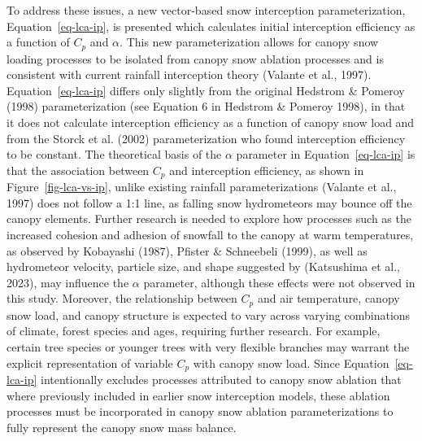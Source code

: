 \documentclass[
  letterpaper,
  DIV=11,
  numbers=noendperiod]{scrartcl}
\begin{document}
To address these issues, a new vector-based snow interception
parameterization, Equation~\ref{eq-lca-ip}, is presented which
calculates initial interception efficiency as a function of \(C_p\) and
\(\alpha\). This new parameterization allows for canopy snow loading
processes to be isolated from canopy snow ablation processes and is
consistent with current rainfall interception theory (Valante et al.,
1997). Equation~\ref{eq-lca-ip} differs only slightly from the original
Hedstrom \& Pomeroy (1998) parameterization (see Equation 6 in Hedstrom
\& Pomeroy 1998), in that it does not calculate interception efficiency
as a function of canopy snow load and from the Storck et al. (2002)
parameterization who found interception efficiency to be constant. The
theoretical basis of the \(\alpha\) parameter in
Equation~\ref{eq-lca-ip} is that the association between \(C_p\) and
interception efficiency, as shown in Figure~\ref{fig-lca-vs-ip}, unlike
existing rainfall parameterizations (Valante et al., 1997) does not
follow a 1:1 line, as falling snow hydrometeors may bounce off the
canopy elements. Further research is needed to explore how processes
such as the increased cohesion and adhesion of snowfall to the canopy at
warm temperatures, as observed by Kobayashi (1987), Pfister \&
Schneebeli (1999), as well as hydrometeor velocity, particle size, and
shape suggested by (Katsushima et al., 2023), may influence the
\(\alpha\) parameter, although these effects were not observed in this
study. Moreover, the relationship between \(C_p\) and air temperature,
canopy snow load, and canopy structure is expected to vary across
varying combinations of climate, forest species and ages, requiring
further research. For example, certain tree species or younger trees
with very flexible branches may warrant the explicit representation of
variable \(C_p\) with canopy snow load. Since Equation~\ref{eq-lca-ip}
intentionally excludes processes attributed to canopy snow ablation that
where previously included in earlier snow interception models, these
ablation processes must be incorporated in canopy snow ablation
parameterizations to fully represent the canopy snow mass balance.
\end{document}
